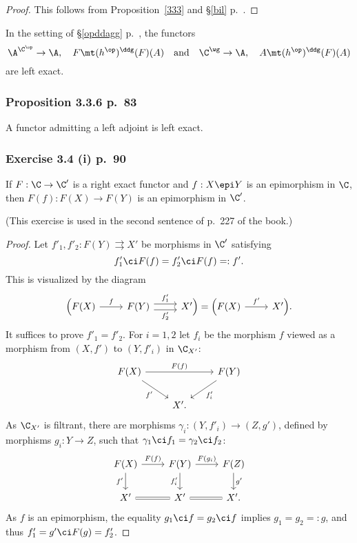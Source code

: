 \documentclass[12pt]{article}
\theoremstyle{remark}
\theoremstyle{definition}
\begin{document}
\begin{proof}
This follows from Proposition~\ref{333} and \S\ref{bil} p.~.
\end{proof} 

\begin{cor}
In the setting of \S\ref{opddagg} p.~, the functors
$$
\A^{\C^{\op}}\to\A,\quad F\mt(h^{\op})^\ddg(F)(A)\quad\text{and}\quad\C^\wg\to\A,\quad A\mt(h^{\op})^\ddg(F)(A)
$$ 
are left exact. 
\end{cor} 

\subsubsection{Proposition 3.3.6 p.~83}

\begin{prop}[Proposition 3.3.6 p.~83]
A functor admitting a left adjoint is left exact.
\end{prop}

\subsubsection{Exercise 3.4 (i) p.~90}

\begin{prop}[Exercise 3.4 (i) p.~90]
If $F:\C\to\C'$ is a right exact functor and $f:X\epi Y$ is an epimorphism in $\C$, then $F(f):F(X)\to F(Y)$ is an epimorphism in $\C'$.
\end{prop}

(This exercise is used in the second sentence of p.~227 of the book.)

\begin{proof}
Let $f'_1,f'_2:F(Y)\rightrightarrows X'$ be morphisms in $\C'$ satisfying 
$$
f'_1\ci F(f)=f'_2\ci F(f)=:f'.
$$
This is visualized by the diagram
$$
\begin{tikzcd}
\Big(F(X)\ar{r}{f}&F(Y)\ar[yshift=.7ex]{r}{f'_1}\ar[yshift=-.7ex]{r}[swap]{f'_2}&X'\Big)=\Big(F(X)\ar{r}{f'}&X'\Big).
\end{tikzcd}
$$ 
It suffices to prove $f'_1=f'_2$. For $i=1,2$ let $f_i$ be the morphism $f$ viewed as a morphism from $(X,f')$ to $(Y,f'_i)$ in $\C_{X'}$: 
$$
\begin{tikzcd}
F(X)\ar{dr}[swap]{f'}\ar{rr}{F(f)}&&F(Y)\ar{dl}{f'_i}\\ 
{}&X'.
\end{tikzcd}
$$
As $\C_{X'}$ is filtrant, there are morphisms $\gamma_i:(Y,f'_i)\to(Z,g')$, defined by morphisms $g_i:Y\to Z$, such that $\gamma_1\ci f_1=\gamma_2\ci f_2$:
$$
\begin{tikzcd}
F(X)\ar{d}[swap]{f'}\ar{r}{F(f)}&F(Y)\ar{d}[swap]{f'_i}\ar{r}{F(g_i)}&F(Z)\ar{d}{g'}\\ 
X'\ar[equal]{r}&X'\ar[equal]{r}&X'.
\end{tikzcd}
$$
As $f$ is an epimorphism, the equality $g_1\ci f=g_2\ci f$ implies $g_1=g_2=:g$, and thus $f'_1=g'\ci F(g)=f'_2$.
\end{proof}
\end{document}
